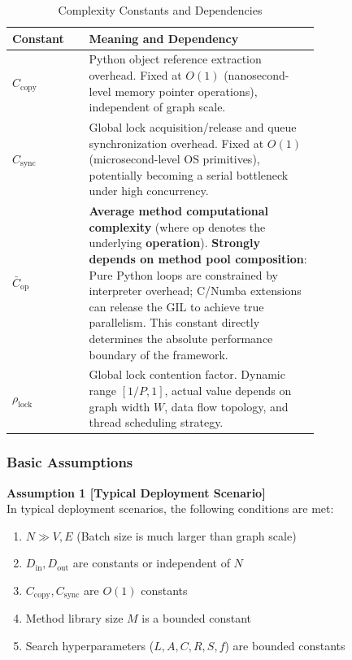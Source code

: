 \begin{table}[htbp]
    \centering
    \caption{Complexity Constants and Dependencies}
    \label{tab:constants}
    \begin{tabular}{lp{0.75\linewidth}}
        \toprule
        \textbf{Constant} & \textbf{Meaning and Dependency} \\
        \midrule
        $C_{\mathrm{copy}}$ & Python object reference extraction overhead. Fixed at $O(1)$ (nanosecond-level memory pointer operations), independent of graph scale. \\
        $C_{\mathrm{sync}}$ & Global lock acquisition/release and queue synchronization overhead. Fixed at $O(1)$ (microsecond-level OS primitives), potentially becoming a serial bottleneck under high concurrency. \\
        $\bar{C}_{\mathrm{op}}$ & \textbf{Average method computational complexity} (where $\mathrm{op}$ denotes the underlying \textbf{operation}). \textbf{Strongly depends on method pool composition}: Pure Python loops are constrained by interpreter overhead; C/Numba extensions can release the GIL to achieve true parallelism. This constant directly determines the absolute performance boundary of the framework. \\
        $\rho_{\mathrm{lock}}$ & Global lock contention factor. Dynamic range $[1/P, 1]$, actual value depends on graph width $W$, data flow topology, and thread scheduling strategy. \\
        \bottomrule
    \end{tabular}
\end{table}

\subsubsection{Basic Assumptions}

\textbf{Assumption 1 [Typical Deployment Scenario]} \\
In typical deployment scenarios, the following conditions are met:
\begin{enumerate}
    \item $N \gg V, E$ (Batch size is much larger than graph scale)
    \item $D_{\mathrm{in}}, D_{\mathrm{out}}$ are constants or independent of $N$
    \item $C_{\mathrm{copy}}, C_{\mathrm{sync}}$ are $O(1)$ constants
    \item Method library size $M$ is a bounded constant
    \item Search hyperparameters ($L, A, C, R, S, f$) are bounded constants
\end{enumerate}

